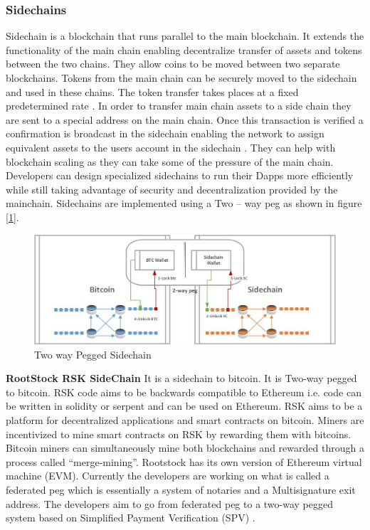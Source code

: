 \subsubsection{Sidechains}
Sidechain is a blockchain that runs parallel to the main blockchain. It extends the functionality of the main chain enabling decentralize transfer of assets and tokens between the two chains. They allow coins to be moved between two separate blockchains. Tokens from the main chain can be securely moved to the sidechain and used in these chains. The token transfer takes places at a fixed predetermined rate \cite{misc:013}. In order to transfer main chain assets to a side chain they are sent to a special address on the main chain. Once this transaction is verified a confirmation is broadcast in the sidechain enabling the network to assign equivalent assets to the users account in the sidechain \cite{paper:004}. They can help with blockchain scaling as they can take some of the pressure of the main chain. Developers can design specialized sidechains to run their Dapps more efficiently while still taking advantage of security and decentralization provided by the mainchain. Sidechains are implemented using a Two – way peg as shown in figure [\ref{fig:SC}].
\vspace*{2cm}
\begin{figure}[h]
	\centering
    \includegraphics[width=160mm,scale=1]{figs/sidechain}
	\caption{Two way Pegged Sidechain }
	\label{fig:SC}
\end{figure}

\textbf{RootStock RSK SideChain}
It is a sidechain to bitcoin. It is Two-way pegged to bitcoin. RSK code aims to be backwards compatible to Ethereum i.e. code can be written in solidity or serpent and can be used on Ethereum. RSK aims to be a platform for decentralized applications and smart contracts on bitcoin. Miners are incentivized to mine smart contracts on RSK by rewarding them with bitcoins. Bitcoin miners can simultaneously mine both blockchains and rewarded through a process called “merge-mining”. Rootstock has its own version of Ethereum virtual machine (EVM). Currently the developers are working on what is called a federated peg which is essentially a system of notaries and a Multisignature exit address. The developers aim to go from federated peg to a two-way pegged system based on Simplified Payment Verification (SPV) \cite{andy_mb} \cite{paper:005}. 

